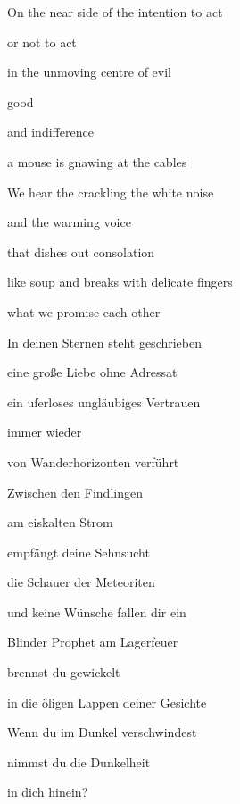 \bigskip



\bigskip

On the near side of the intention to act

or not to act

in the unmoving centre of evil

good

and indifference


\bigskip

a mouse is gnawing at the cables

We hear the crackling the white noise

and the warming voice

that dishes out consolation

like soup and breaks with delicate fingers 

what we promise each other


\bigskip


\bigskip



\bigskip


\bigskip

In deinen Sternen steht geschrieben

eine große Liebe ohne Adressat

ein uferloses ungläubiges Vertrauen

immer wieder

von Wanderhorizonten verführt


\bigskip

Zwischen den Findlingen

am eiskalten Strom

empfängt deine Sehnsucht

die Schauer der Meteoriten

und keine Wünsche fallen dir ein


\bigskip

Blinder Prophet am Lagerfeuer

brennst du gewickelt

in die öligen Lappen deiner Gesichte


\bigskip

Wenn du im Dunkel verschwindest

nimmst du die Dunkelheit 

in dich hinein?


\bigskip


\bigskip


\bigskip


